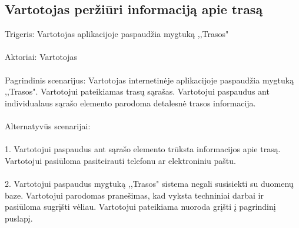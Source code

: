 \documentclass[oneside]{VUMIFPSkursinis}
\begin{document}
\subsection{Vartotojas peržiūri informaciją apie trasą}
	Trigeris: Vartotojas aplikacijoje paspaudžia mygtuką ,,Trasos"\\ \\
	Aktoriai: Vartotojas\\ \\
	Pagrindinis scenarijus: Vartotojas internetinėje aplikacijoje paspaudžia mygtuką ,,Trasos". Vartotojui pateikiamas trasų sąrašas. Vartotojui paspaudus ant individualaus sąrašo elemento parodoma detalesnė trasos informacija.\\ \\
	Alternatyvūs scenarijai:\\ \\
1. Vartotojui paspaudus ant sąrašo elemento trūksta informacijos apie trasą. Vartotojui pasiūloma pasiteirauti telefonu ar elektroniniu paštu.\\ \\
2. Vartotojui paspaudus mygtuką ,,Trasos" sistema negali susisiekti su duomenų baze. Vartotojui parodomas pranešimas, kad vyksta techniniai darbai ir pasiūloma sugrįšti vėliau. Vartotojui pateikiama nuoroda grįšti į pagrindinį puslapį.\\ \\
	
\end{document}
